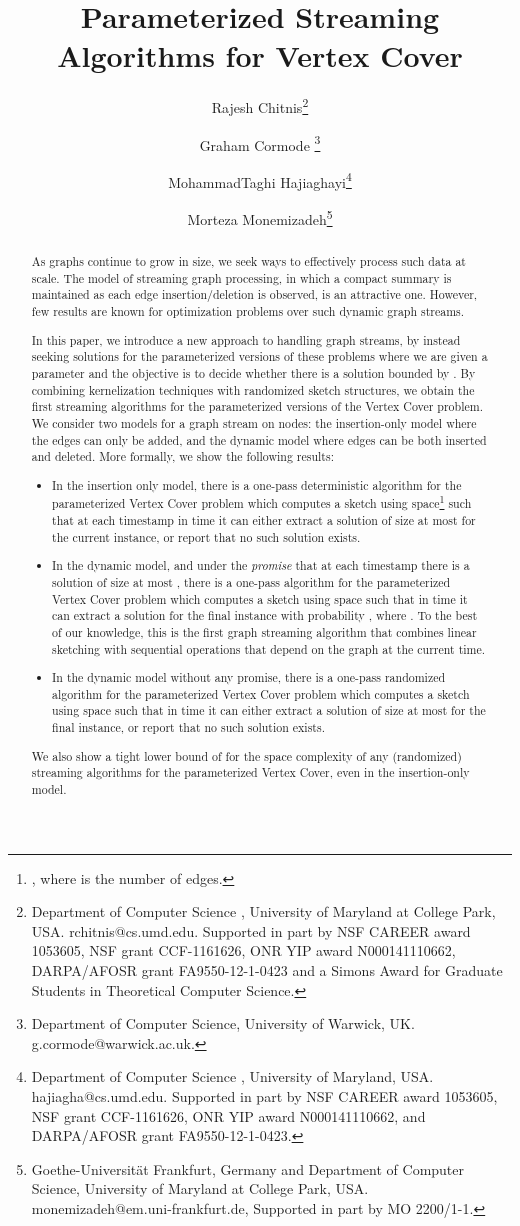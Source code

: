 \documentclass[11pt,letter]{article}
\title{Parameterized Streaming Algorithms for Vertex Cover}
\author{
Rajesh Chitnis\thanks{Department of Computer Science , University of Maryland at
College Park, USA.  rchitnis@cs.umd.edu. Supported in part by NSF CAREER award 1053605, NSF grant CCF-1161626, ONR YIP award
N000141110662, DARPA/AFOSR grant FA9550-12-1-0423 and a Simons Award for Graduate Students in Theoretical Computer Science.}
\and
Graham Cormode \thanks{Department of Computer Science, University of
  Warwick, UK. g.cormode@warwick.ac.uk.}
\and
 MohammadTaghi Hajiaghayi\thanks{Department of Computer Science , University of Maryland,
 USA.  hajiagha@cs.umd.edu. Supported in part by NSF CAREER award 1053605, NSF grant CCF-1161626, ONR YIP award
N000141110662, and DARPA/AFOSR grant FA9550-12-1-0423.}
\and
Morteza Monemizadeh\thanks{Goethe-Universit\"{a}t Frankfurt, Germany and Department of Computer Science, University of Maryland at
College Park, USA.   monemizadeh@em.uni-frankfurt.de,
Supported in part by MO 2200/1-1.}
}
\begin{document}
\sloppy
\maketitle


\begin{abstract}
As graphs continue to grow in size, we seek ways to effectively process such data at scale.
The model of streaming graph processing, in which a compact summary is maintained as each
edge insertion/deletion is observed, is an attractive one.
However, few results are known for optimization problems over such dynamic graph streams.

In this paper, we introduce a new approach to handling graph streams,
by instead seeking solutions for the parameterized versions of these problems
where we are given a parameter  and the objective is to decide
whether there is a solution bounded by .
By combining kernelization techniques with randomized sketch structures,
we obtain the first streaming algorithms for the parameterized versions of
the Vertex Cover problem. We consider two models for a graph stream on
 nodes:
the insertion-only model where the edges can only be added,
and the dynamic model where edges can be both inserted and deleted.
More formally, we show the following results:

\begin{itemize}
\item In the insertion only model, there is a one-pass deterministic algorithm
for the parameterized Vertex Cover problem which computes a sketch
using  space\footnote{, where  is the number of edges.} such that at each
  timestamp in time  it can either extract a solution of
  size at most  for the current instance, or report that no such solution exists.

\item In the dynamic model, and under the \emph{promise} that at each
timestamp there is a solution of size at most , there is a one-pass
algorithm for the parameterized Vertex Cover problem which computes
a sketch using  space such that in time  it can
extract a solution for the final instance with probability , where .
To the best of our knowledge, this is the first graph streaming algorithm that combines linear
sketching with sequential operations that depend on the graph at the current time.


\item In the dynamic model without any promise, there is a one-pass
randomized algorithm for the parameterized Vertex Cover problem
which computes a sketch using  space such that in time  it can either extract a solution of size
at most  for the final instance, or report that no such solution exists.
\end{itemize}
We also show a tight lower bound of  for the space
complexity of any (randomized) streaming algorithms for
the parameterized Vertex Cover, even in the insertion-only model.
\end{abstract}
\end{document}
